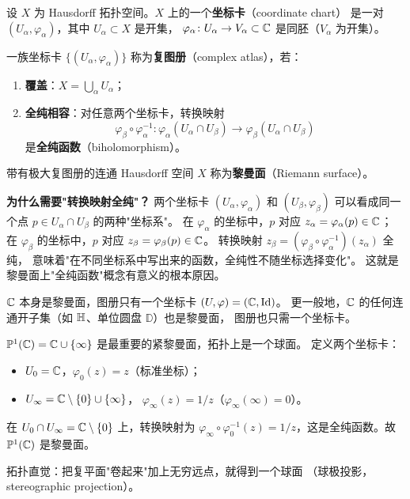 \begin{definition}[坐标卡与复图册]
\label{def:coordinate-chart}
设 $X$ 为 Hausdorff 拓扑空间。$X$ 上的一个\textbf{坐标卡}（coordinate chart）
是一对 $(U_\alpha, \varphi_\alpha)$，其中 $U_\alpha \subset X$ 是开集，
$\varphi_\alpha\colon U_\alpha \to V_\alpha \subset \mathbb{C}$ 是同胚（$V_\alpha$ 为开集）。

一族坐标卡 $\{(U_\alpha, \varphi_\alpha)\}$ 称为\textbf{复图册}（complex atlas），若：
\begin{enumerate}
  \item \textbf{覆盖}：$X = \bigcup_\alpha U_\alpha$；
  \item \textbf{全纯相容}：对任意两个坐标卡，转换映射
    \[
      \varphi_\beta \circ \varphi_\alpha^{-1}\colon
      \varphi_\alpha(U_\alpha \cap U_\beta) \to \varphi_\beta(U_\alpha \cap U_\beta)
    \]
    是\textbf{全纯函数}（biholomorphism）。
\end{enumerate}
带有极大复图册的连通 Hausdorff 空间 $X$ 称为\textbf{黎曼面}（Riemann surface）。
\end{definition}



\textbf{为什么需要"转换映射全纯"？}
两个坐标卡 $(U_\alpha, \varphi_\alpha)$ 和 $(U_\beta, \varphi_\beta)$
可以看成同一个点 $p \in U_\alpha \cap U_\beta$ 的两种"坐标系"。
在 $\varphi_\alpha$ 的坐标中，$p$ 对应 $z_\alpha = \varphi_\alpha(p) \in \mathbb{C}$；
在 $\varphi_\beta$ 的坐标中，$p$ 对应 $z_\beta = \varphi_\beta(p) \in \mathbb{C}$。
转换映射 $z_\beta = (\varphi_\beta \circ \varphi_\alpha^{-1})(z_\alpha)$ 全纯，
意味着"在不同坐标系中写出来的函数，全纯性不随坐标选择变化"。
这就是黎曼面上"全纯函数"概念有意义的根本原因。

\begin{example}
\label{ex:C-is-riemann-surface}
$\mathbb{C}$ 本身是黎曼面，图册只有一个坐标卡 $(U, \varphi) = (\mathbb{C}, \mathrm{Id})$。
更一般地，$\mathbb{C}$ 的任何连通开子集（如 $\mathbb{H}$、单位圆盘 $\mathbb{D}$）也是黎曼面，
图册也只需一个坐标卡。
\end{example}

\begin{example}
\label{ex:riemann-sphere}
$\mathbb{P}^1(\mathbb{C}) = \mathbb{C} \cup \{\infty\}$ 是最重要的紧黎曼面，拓扑上是一个球面。
定义两个坐标卡：
\begin{itemize}
  \item $U_0 = \mathbb{C}$，$\varphi_0(z) = z$（标准坐标）；
  \item $U_\infty = \mathbb{C} \setminus \{0\} \cup \{\infty\}$，
    $\varphi_\infty(z) = 1/z$（$\varphi_\infty(\infty) = 0$）。
\end{itemize}
在 $U_0 \cap U_\infty = \mathbb{C} \setminus \{0\}$ 上，转换映射为
$\varphi_\infty \circ \varphi_0^{-1}(z) = 1/z$，这是全纯函数。故 $\mathbb{P}^1(\mathbb{C})$ 是黎曼面。

拓扑直觉：把复平面"卷起来"加上无穷远点，就得到一个球面
（球极投影，stereographic projection）。
\end{example}

